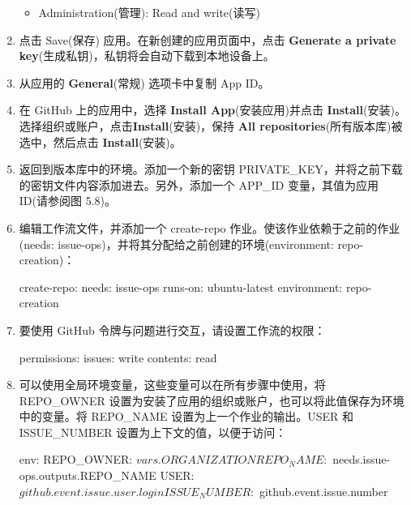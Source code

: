 \begin{enumerate}
\begin{itemize}
\item 
Administration(管理): Read and write(读写)
\end{itemize}

\item 
点击 Save(保存) 应用。在新创建的应用页面中，点击 \textbf{Generate a private key}(生成私钥)，私钥将会自动下载到本地设备上。

\item 
从应用的 \textbf{General}(常规) 选项卡中复制 App ID。

\item 
在 GitHub 上的应用中，选择 \textbf{Install App}(安装应用)并点击 \textbf{Install}(安装)。选择组织或账户，点击\textbf{Install}(安装)，保持 \textbf{All repositories}(所有版本库)被选中，然后点击 \textbf{Install}(安装)。

\item 
返回到版本库中的环境。添加一个新的密钥 PRIVATE\_KEY，并将之前下载的密钥文件内容添加进去。另外，添加一个 APP\_ID 变量，其值为应用 ID(请参阅图 5.8)。


\item 
编辑工作流文件，并添加一个 create-repo 作业。使该作业依赖于之前的作业(needs: issue-ops)，并将其分配给之前创建的环境(environment: repo-creation)：

\begin{shell}
create-repo:
  needs: issue-ops
  runs-on: ubuntu-latest
  environment: repo-creation
\end{shell}

\item 
要使用 GitHub 令牌与问题进行交互，请设置工作流的权限：

\begin{shell}
  permissions:
    issues: write
    contents: read
\end{shell}

\item 
可以使用全局环境变量，这些变量可以在所有步骤中使用，将 REPO\_OWNER 设置为安装了应用的组织或账户，也可以将此值保存为环境中的变量。将 REPO\_NAME 设置为上一个作业的输出。USER 和 ISSUE\_NUMBER 设置为上下文的值，以便于访问：

\begin{shell}
env:
  REPO_OWNER: ${{ vars.ORGANIZATION }}
  REPO_NAME: ${{ needs.issue-ops.outputs.REPO_NAME }}
  USER: ${{ github.event.issue.user.login }}
  ISSUE_NUMBER: ${{ github.event.issue.number }}
\end{shell}


\end{enumerate}
